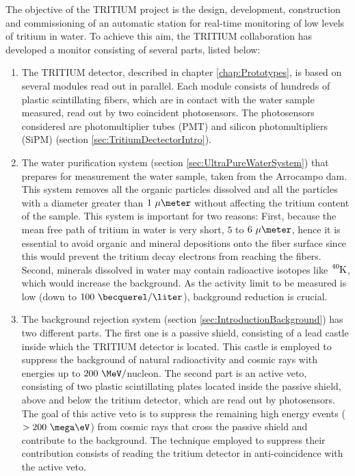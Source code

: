 The objective of the TRITIUM project is the design, development, construction and commissioning of an automatic station for real-time monitoring of low levels of tritium in water. To achieve this aim, the TRITIUM collaboration has developed a monitor consisting of several parts, listed below: 

\begin{enumerate}

\item{} The TRITIUM detector, described in chapter \ref{chap:Prototypes}, is based on several modules read out in parallel. Each module consists of hundreds of plastic scintillating fibers, which are in contact with the water sample measured, read out by two coincident photosensors. The photosensors considered are photomultiplier tubes (PMT) and silicon photomultipliers (SiPM) (section \ref{sec:TritiumDectectorIntro}).

\item{} The water purification system (section \ref{sec:UltraPureWaterSystem}) that prepares for measurement the water sample, taken from the Arrocampo dam. This system removes all the organic particles dissolved and all the particles with a diameter greater than $1~\mu\meter$ without affecting the tritium content of the sample. This system is important for two reasons: First, because the mean free path of tritium in water is very short, $5$ to $6~\mu\meter$,  hence it is essential to avoid organic and mineral depositions onto the fiber surface since this would prevent the tritium decay electrons from reaching the fibers. Second, minerals dissolved in water may contain radioactive isotopes like $\ce{^{40}K}$, which would increase the background. As the activity limit to be measured is low (down to $100~\becquerel/\liter$), background reduction is crucial.

\item{} The background rejection system (section \ref{sec:IntroductionBackground}) has two different parts. The first one is a passive shield, consisting of a lead castle inside which the TRITIUM detector is located. This castle is employed to suppress the background of natural radioactivity and cosmic rays with energies up to $200~\MeV/$nucleon. The second part is an active veto, consisting of two plastic scintillating plates located inside the passive shield, above and below the tritium detector, which are read out by photosensors. The goal of this active veto is to suppress the remaining high energy events ($>200~\mega\eV$) from cosmic rays that cross the passive shield and contribute to the background. The technique employed to suppress their contribution consists of reading the tritium detector in anti-coincidence with the active veto.


\end{enumerate}
